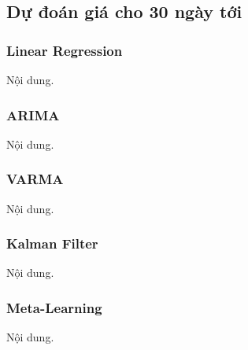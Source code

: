 \subsection{Dự đoán giá cho 30 ngày tới} 
\subsubsection{Linear Regression}
Nội dung.

\subsubsection{ARIMA}
Nội dung.

\subsubsection{VARMA}
Nội dung.

\subsubsection{Kalman Filter}
Nội dung.

\subsubsection{Meta-Learning}
Nội dung.